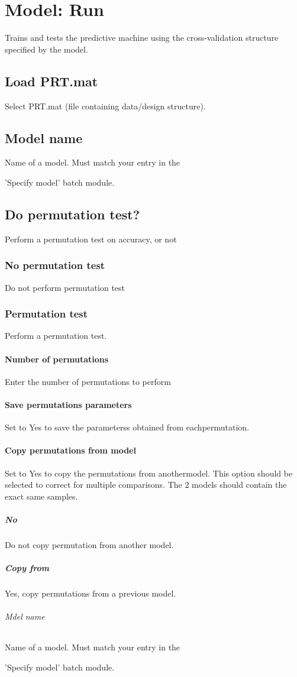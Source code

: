 
\chapter{Model: Run  \label{Chap:cv_model}}

\vskip 1.5cm

Trains and tests the predictive machine using the cross-validation structure specified by the model.


\section{Load PRT.mat}
Select PRT.mat (file containing data/design structure).


\section{Model name}
Name of a model. Must match your entry in the 

'Specify model' batch module.


\section{Do permutation test?}
Perform a permutation test on accuracy, or not


\subsection{No permutation test}
Do not perform permutation test


\subsection{Permutation test}
Perform a permutation test.


\subsubsection{Number of permutations}
Enter the number of permutations to perform


\subsubsection{Save permutations parameters}
Set to Yes to save the parameterss obtained from eachpermutation.


\subsubsection{Copy permutations from model}
Set to Yes to copy the permutations from anothermodel. This option should be selected to correct for multiple comparisons. The 2 models should contain the exact same samples.


\paragraph{No}
Do not copy permutation from another model.


\paragraph{Copy from}
Yes, copy permutations from a previous model.


\subparagraph{Mdel name}
Name of a model. Must match your entry in the 

'Specify model' batch module.

